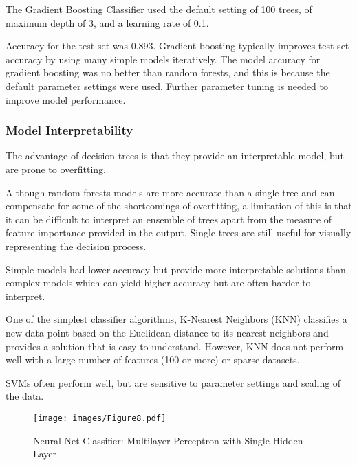 \documentclass[sigconf]{acmart}
\begin{document}
The Gradient Boosting Classifier used the default setting of 100 trees, of 
maximum depth of 3, and a learning rate of 0.1. 

Accuracy for the test set was 0.893. Gradient boosting typically improves test 
set accuracy by using many simple models iteratively. The model accuracy for 
gradient boosting was no better than random forests, and this is because the 
default parameter settings were used. Further parameter tuning is needed 
to improve model performance.


\subsubsection{Model Interpretability}


The advantage of decision trees is that they provide an interpretable model,
but are prone to overfitting. 

Although random forests models are more accurate than a single tree and can
compensate for some of the shortcomings of overfitting, a limitation of this 
is that it can be difficult to interpret an ensemble of trees apart from the 
measure of feature importance provided in the output. Single trees are still 
useful for visually representing the decision process.

Simple models had lower accuracy but provide more interpretable solutions 
than complex models which can yield higher accuracy but are often harder 
to interpret. 

One of the simplest classifier algorithms, K-Nearest Neighbors (KNN)
classifies a new data point based on the Euclidean distance to its 
nearest neighbors and provides a solution that is easy to understand. 
However, KNN does not perform well with a large number of features 
(100 or more) or sparse datasets.

SVMs often perform well, but are sensitive to parameter settings 
and scaling of the data. 

\begin{figure}[!ht]
  \centering\texttt{[image: images/Figure8.pdf]}
  \caption{Neural Net Classifier: Multilayer Perceptron with Single Hidden Layer}
  \label{f:Figur8}
\end{figure}



\end{document}
